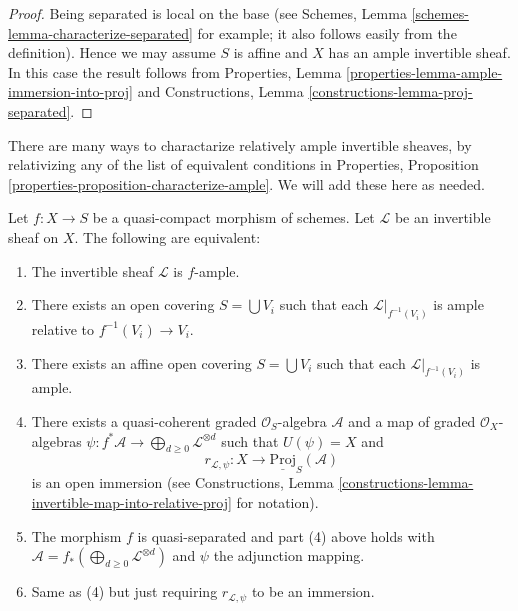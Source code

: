 \begin{proof}
Being separated is local on the base (see
Schemes, Lemma \ref{schemes-lemma-characterize-separated} for example;
it also follows easily from the definition).
Hence we may assume $S$ is affine and $X$
has an ample invertible sheaf. In this case the
result follows from
Properties, Lemma \ref{properties-lemma-ample-immersion-into-proj}
and Constructions, Lemma \ref{constructions-lemma-proj-separated}.
\end{proof}

\noindent
There are many ways to charactarize relatively ample invertible
sheaves, by relativizing any of the list of equivalent conditions in
Properties, Proposition \ref{properties-proposition-characterize-ample}.
We will add these here as needed.

\begin{lemma}
\label{lemma-characterize-relatively-ample}
Let $f : X \to S$ be a quasi-compact morphism of schemes.
Let $\mathcal{L}$ be an invertible sheaf on $X$.
The following are equivalent:
\begin{enumerate}
\item The invertible sheaf $\mathcal{L}$ is $f$-ample.
\item There exists an open covering $S = \bigcup V_i$
such that each $\mathcal{L}|_{f^{-1}(V_i)}$ is ample
relative to $f^{-1}(V_i) \to V_i$.
\item There exists an affine open covering $S = \bigcup V_i$
such that each $\mathcal{L}|_{f^{-1}(V_i)}$ is ample.
\item There exists a quasi-coherent graded $\mathcal{O}_S$-algebra
$\mathcal{A}$ and a map of graded $\mathcal{O}_X$-algebras
$\psi : f^*\mathcal{A} \to \bigoplus_{d \geq 0} \mathcal{L}^{\otimes d}$
such that $U(\psi) = X$ and
$$
r_{\mathcal{L}, \psi} :
X
\longrightarrow
\underline{\text{Proj}}_S(\mathcal{A})
$$
is an open immersion (see Constructions, Lemma
\ref{constructions-lemma-invertible-map-into-relative-proj} for notation).
\item The morphism $f$ is quasi-separated and
part (4) above holds with
$\mathcal{A} = f_*(\bigoplus_{d \geq 0} \mathcal{L}^{\otimes d})$
and $\psi$ the adjunction mapping.
\item Same as (4) but just requiring $r_{\mathcal{L}, \psi}$
to be an immersion.
\end{enumerate}
\end{lemma}

